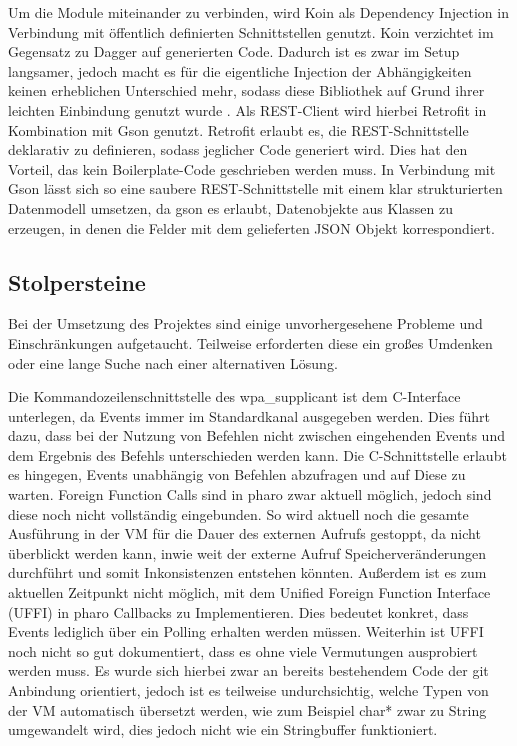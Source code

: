 		Um die Module miteinander zu verbinden, wird Koin \cite{AI-androidKoin} als Dependency Injection in Verbindung mit öffentlich definierten Schnittstellen genutzt. Koin verzichtet im Gegensatz zu Dagger auf generierten Code. Dadurch ist es zwar im Setup langsamer, jedoch macht es für die eigentliche Injection der Abhängigkeiten keinen erheblichen Unterschied mehr, sodass diese Bibliothek auf Grund ihrer leichten Einbindung genutzt wurde \cite{AI-androidKoinSpeed}. Als REST-Client wird hierbei Retrofit in Kombination mit Gson genutzt. Retrofit erlaubt es, die REST-Schnittstelle deklarativ zu definieren, sodass jeglicher Code generiert wird. Dies hat den Vorteil, das kein Boilerplate-Code geschrieben werden muss. In Verbindung mit Gson lässt sich so eine saubere REST-Schnittstelle mit einem klar strukturierten Datenmodell umsetzen, da gson es erlaubt, Datenobjekte aus Klassen zu erzeugen, in denen die Felder mit dem gelieferten JSON Objekt korrespondiert.

	\subsection{Stolpersteine}
		Bei der Umsetzung des Projektes sind einige unvorhergesehene Probleme und Einschränkungen aufgetaucht. Teilweise erforderten diese ein großes Umdenken oder eine lange Suche nach einer alternativen Lösung.
		
		Die Kommandozeilenschnittstelle	des wpa\_supplicant ist dem C-Interface unterlegen, da Events immer im Standardkanal ausgegeben werden. Dies führt dazu, dass bei der Nutzung von Befehlen nicht zwischen eingehenden Events und dem Ergebnis des Befehls unterschieden werden kann. Die C-Schnittstelle erlaubt es hingegen, Events unabhängig von Befehlen abzufragen und auf Diese zu warten. Foreign Function Calls sind in pharo zwar aktuell möglich, jedoch sind diese noch nicht vollständig eingebunden. So wird aktuell noch die gesamte Ausführung in der VM für die Dauer des externen Aufrufs gestoppt, da nicht überblickt werden kann, inwie weit der externe Aufruf Speicherveränderungen durchführt und somit Inkonsistenzen entstehen könnten. Außerdem ist es zum aktuellen Zeitpunkt nicht möglich, mit dem Unified Foreign Function Interface (UFFI) in pharo Callbacks zu Implementieren. Dies bedeutet konkret, dass Events lediglich über ein Polling erhalten werden müssen.
		Weiterhin ist UFFI noch nicht so gut dokumentiert, dass es ohne viele Vermutungen ausprobiert werden muss. Es wurde sich hierbei zwar an bereits bestehendem Code der git Anbindung orientiert, jedoch ist es teilweise undurchsichtig, welche Typen von der VM automatisch übersetzt werden, wie zum Beispiel char* zwar zu String umgewandelt wird, dies jedoch nicht wie ein Stringbuffer funktioniert.
		
